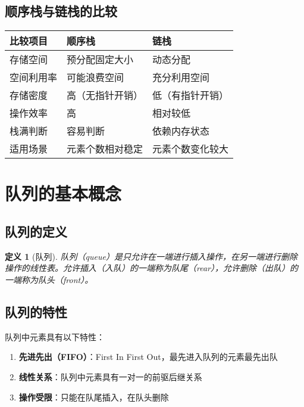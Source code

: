 \documentclass[12pt,a4paper]{amsart}
\newtheorem{definition}{定义}[section]
\begin{document}
\subsection{顺序栈与链栈的比较}

\begin{center}
\begin{tabular}{|l|l|l|}
\hline
\textbf{比较项目} & \textbf{顺序栈} & \textbf{链栈} \\
\hline
存储空间 & 预分配固定大小 & 动态分配 \\
\hline
空间利用率 & 可能浪费空间 & 充分利用空间 \\
\hline
存储密度 & 高（无指针开销） & 低（有指针开销） \\
\hline
操作效率 & 高 & 相对较低 \\
\hline
栈满判断 & 容易判断 & 依赖内存状态 \\
\hline
适用场景 & 元素个数相对稳定 & 元素个数变化较大 \\
\hline
\end{tabular}
\end{center}

\section{队列的基本概念}

\subsection{队列的定义}

\begin{definition}[队列]
队列（queue）是只允许在一端进行插入操作，在另一端进行删除操作的线性表。允许插入（入队）的一端称为队尾（rear），允许删除（出队）的一端称为队头（front）。
\end{definition}

\subsection{队列的特性}

队列中元素具有以下特性：
\begin{enumerate}
\item \textbf{先进先出（FIFO）}：First In First Out，最先进入队列的元素最先出队
\item \textbf{线性关系}：队列中元素具有一对一的前驱后继关系
\item \textbf{操作受限}：只能在队尾插入，在队头删除
\end{enumerate}
\end{document}
